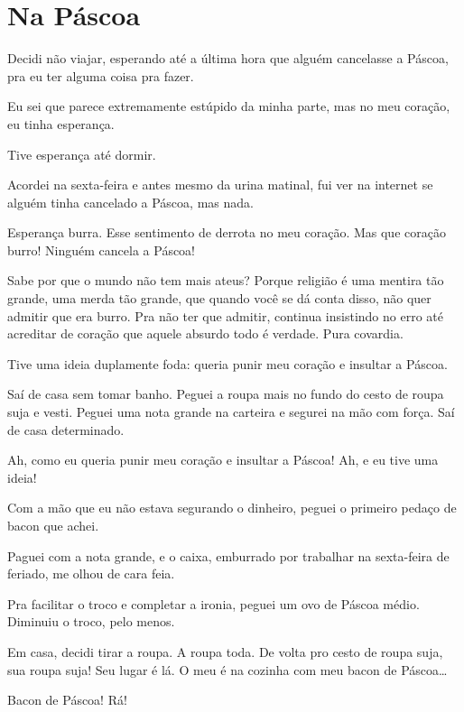 \chapter{Na Páscoa}

Decidi não viajar, esperando até a última hora que alguém cancelasse a Páscoa, pra eu ter alguma coisa pra fazer.

\begin{sloppypar}
Eu sei que parece extremamente estúpido da minha parte, mas no meu coração, eu tinha esperança.
\end{sloppypar}

Tive esperança até dormir.

Acordei na sexta-feira e antes mesmo da urina matinal, fui ver na internet se alguém tinha cancelado a Páscoa, mas nada.

Esperança burra. Esse sentimento de derrota no meu coração. Mas que coração burro! Ninguém cancela a Páscoa!

Sabe por que o mundo não tem mais ateus? Porque religião é uma mentira tão grande, uma merda tão grande, que quando você se dá conta disso, não quer admitir que era burro. Pra não ter que admitir, continua insistindo no erro até acreditar de coração que aquele absurdo todo é verdade. Pura covardia.

Tive uma ideia duplamente foda: queria punir meu coração e insultar a Páscoa.


\begin{sloppypar}
Saí de casa sem tomar banho. Peguei a roupa mais no fundo do cesto de roupa suja e vesti. Peguei uma nota grande na carteira e segurei na mão com força. Saí de casa determinado.
\end{sloppypar}

Ah, como eu queria punir meu coração e insultar a Páscoa! Ah, e eu tive uma ideia!

Com a mão que eu não estava segurando o dinheiro, peguei o primeiro pedaço de bacon que achei.

Paguei com a nota grande, e o caixa, emburrado por trabalhar na sexta-feira de feriado, me olhou de cara feia.

Pra facilitar o troco e completar a ironia, peguei um ovo de Páscoa médio. Diminuiu o troco, pelo menos.

Em casa, decidi tirar a roupa. A roupa toda. De volta pro cesto de roupa suja, sua roupa suja! Seu lugar é lá. O meu é na cozinha com meu bacon de Páscoa\ldots

Bacon de Páscoa! Rá!

